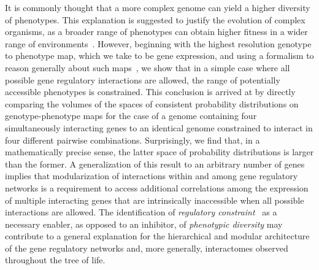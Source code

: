 It is commonly thought that a more complex genome can yield a higher diversity of phenotypes. This explanation is suggested to justify the evolution of complex organisms, as a broader range of phenotypes can obtain higher fitness in a wider range of environments~\cite{Adami2000,Carroll2001,Doebeli2010,Prochnik2010}. However, beginning with the highest resolution genotype to phenotype map, which we take to be gene expression, and using a formalism to reason generally about such maps~\cite{Lane1998,MacLane1992,Awodey2006,Abramsky2011}, we show that in a simple case where all possible gene regulatory interactions are allowed, the range of potentially accessible phenotypes is constrained. This conclusion is arrived at by directly comparing the volumes of the spaces of consistent probability distributions on genotype-phenotype maps for the case of a genome containing four simultaneously interacting genes to an identical genome constrained to interact in four different pairwise combinations. Surprisingly, we find that, in a mathematically precise sense, the latter space of probability distributions is larger than the former. A generalization of this result to an arbitrary number of genes implies that modularization of interactions within and among gene regulatory networks is a requirement to access additional correlations among the expression of multiple interacting genes that are intrinsically inaccessible when all possible interactions are allowed. The identification of \emph{regulatory constraint}~\cite{Bar-Even2006,Johnson2010a} as a necessary enabler, as opposed to an inhibitor, of \emph{phenotypic diversity} may contribute to a general explanation for the hierarchical and modular architecture~\cite{Ravasz2002,Segre2005,Wagner2007,Erwin2009,Bhardwaj2010,Colm} of the gene regulatory networks and, more generally, interactomes observed throughout the tree of life.
